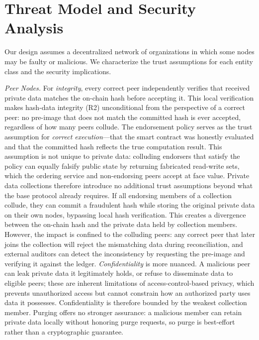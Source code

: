 \section{Threat Model and Security Analysis}
\label{s:threat-model}
Our design assumes a decentralized network of organizations in which some nodes may be faulty or malicious. We characterize the trust assumptions for each entity class and the security implications.

\textit{Peer Nodes.} For \textit{integrity}, every correct peer independently verifies that received private data matches the on-chain hash before accepting it. This local verification makes hash-data integrity (R2) unconditional from the perspective of a correct peer: no pre-image that does not match the committed hash is ever accepted, regardless of how many peers collude. The endorsement policy serves as the trust assumption for \textit{correct execution}---that the smart contract was honestly evaluated and that the committed hash reflects the true computation result. This assumption is not unique to private data: colluding endorsers that satisfy the policy can equally falsify public state by returning fabricated read-write sets, which the ordering service and non-endorsing peers accept at face value. Private data collections therefore introduce no additional trust assumptions beyond what the base protocol already requires. If all endorsing members of a collection collude, they can commit a fraudulent hash while storing the original private data on their own nodes, bypassing local hash verification. This creates a divergence between the on-chain hash and the private data held by collection members. However, the impact is confined to the colluding peers: any correct peer that later joins the collection will reject the mismatching data during reconciliation, and external auditors can detect the inconsistency by requesting the pre-image and verifying it against the ledger. \textit{Confidentiality} is more nuanced. A malicious peer can leak private data it legitimately holds, or refuse to disseminate data to eligible peers; these are inherent limitations of access-control-based privacy, which prevents unauthorized access but cannot constrain how an authorized party uses data it possesses. Confidentiality is therefore bounded by the weakest collection member. Purging offers no stronger assurance: a malicious member can retain private data locally without honoring purge requests, so purge is best-effort rather than a cryptographic guarantee.

